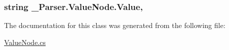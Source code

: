 \subsubsection[{\texorpdfstring{Value}{Value}}]{\setlength{\rightskip}{0pt plus 5cm}string \+\_\+Parser.\+Value\+Node.\+Value\hspace{0.3cm}{\ttfamily [get]}, {\ttfamily [protected]}}\hypertarget{class__1920_parser_1_1_value_node_a56cb68d4bb4856747b88651e874d1dcd}{}\label{class__1920_parser_1_1_value_node_a56cb68d4bb4856747b88651e874d1dcd}


The documentation for this class was generated from the following file\+:\begin{DoxyCompactItemize}
\item 
\hyperlink{_value_node_8cs}{Value\+Node.\+cs}\end{DoxyCompactItemize}
